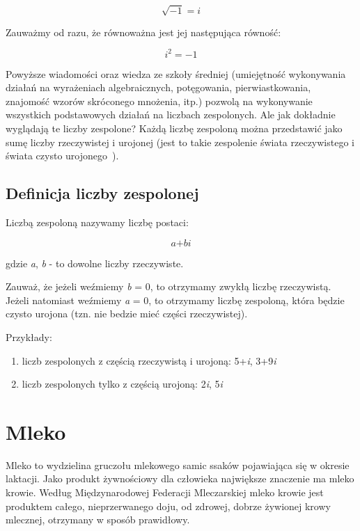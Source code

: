 \documentclass[a4paper,12pt]{article}
\begin{document}
\begin{equation}
\sqrt{-1}=\textit{i}
\end{equation}

Zauważmy od razu, że równoważna jest jej następująca równość:

\begin{equation}
\textit{i}^{2}=-1
\end{equation}

Powyższe wiadomości oraz wiedza ze szkoły średniej (umiejętność wykonywania działań na wyrażeniach algebraicznych, potęgowania, pierwiastkowania, znajomość wzorów skróconego mnożenia, itp.) pozwolą na wykonywanie wszystkich podstawowych działań na liczbach zespolonych. Ale jak dokładnie wyglądają te liczby zespolone? Każdą liczbę zespoloną można przedstawić jako sumę liczby rzeczywistej i urojonej (jest to takie zespolenie świata rzeczywistego i świata czysto urojonego~\cite{pa}).

\subsection{Definicja liczby zespolonej}

Liczbą zespoloną nazywamy liczbę postaci:

\begin{equation}
\textit{a}+\textit{bi}
\end{equation}

gdzie \textit{a}, \textit{b} - to dowolne liczby rzeczywiste.

Zauważ, że jeżeli weźmiemy \textit{b} = 0, to otrzymamy zwykłą liczbę rzeczywistą. Jeżeli natomiast weźmiemy \textit{a} = 0, to otrzymamy liczbę zespoloną, która będzie czysto urojona (tzn. nie bedzie mieć części rzeczywistej).

Przykłady:

\begin{enumerate}
  \item liczb zespolonych z częścią rzeczywistą i urojoną:
  5+\textit{i}, 3+9\textit{i}
  \item liczb zespolonych tylko z częścią urojoną:
  2\textit{i}, 5\textit{i}
\end{enumerate}

\section{Mleko}
Mleko to wydzielina gruczołu mlekowego samic ssaków pojawiająca się w okresie laktacji. Jako produkt żywnościowy dla człowieka największe znaczenie ma mleko krowie. Według Międzynarodowej Federacji Mleczarskiej mleko krowie jest produktem całego, nieprzerwanego doju, od zdrowej, dobrze żywionej krowy mlecznej, otrzymany w sposób prawidłowy.
\end{document}
